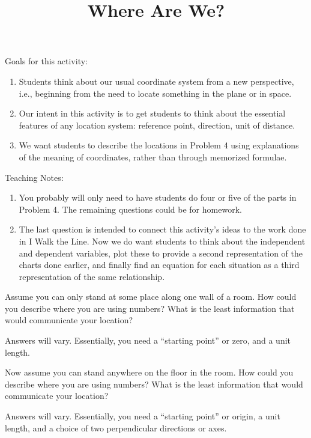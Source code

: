 \documentclass{ximera}
\title{Where Are We?}
\begin{document}
\begin{abstract}\end{abstract}
\maketitle
\begin{instructorIntro}
Goals for this activity:
\begin{enumerate}
\item Students think about our usual coordinate system from a new perspective, i.e., beginning from the need to locate something in the plane or in space.
\item  Our intent in this activity is to get students to think about the essential features of any location system: reference point, direction, unit of distance.
\item We want students to describe the locations in Problem 4 using explanations of the meaning of coordinates, rather than through memorized formulae.
\end{enumerate}

Teaching Notes:
\begin{enumerate}
\item  You probably will only need to have students do four or five of the parts in Problem 4.  The remaining questions could be for homework.
\item  The last question is intended to connect this activity's ideas to the work done in I Walk the Line.  Now we do want students to think about the independent and dependent variables, plot these to provide a second representation of the charts done earlier, and finally find an equation for each situation as a third representation of the same relationship.
\end{enumerate}
\end{instructorIntro}


\begin{problem}
Assume you can only stand at some place along one wall of a room.  How could you describe where you are using numbers?  What is the least information that would communicate your location?

\begin{solution}
Answers will vary.  Essentially, you need a ``starting point'' or zero, and a unit length.
\end{solution}
\end{problem}

\begin{problem}
Now assume you can stand anywhere on the floor in the room.  How could you describe where you are using numbers?  What is the least information that would communicate your location?

\begin{solution}
Answers will vary.  Essentially, you need a ``starting point'' or origin, a unit length, and a choice of two perpendicular directions or axes.
\end{solution}
\end{problem}
\end{document}
